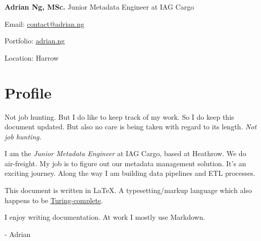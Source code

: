 \documentclass[letterpaper,11pt]{article}
\begin{document}
\noindent
\Large
\textbf{Adrian Ng, MSc.}
\newline
\small
Junior Metadata Engineer at IAG Cargo
\newline
\begin{description*}
	\item[Email:] \href{mailto:contact@adrian.ng}{contact@adrian.ng}
	\item[Portfolio:] \href{https://adrian.ng}{adrian.ng}
	\item[Location:] Harrow
\end{description*}
\hfill
\vspace{0.25cm}
\noindent
\begin{minipage}[t]{0.5\linewidth}
	\section{Profile}
	Not job hunting. But I do like to keep track of my work. So I do keep this document updated. But also no care is being taken with regard to its length. \textit{Not job hunting.}
	\par\quad

	I am the \textit{Junior Metadata Engineer} at IAG Cargo, based at Heathrow. We do air-freight. My job is to figure out our metadata management solution. It's an exciting journey. Along the way I am building data pipelines and ETL processes.
	\par\quad

	This document is written in \LaTeX. A typesetting/markup language which also happens to be \href{https://www.overleaf.com/learn/latex/Articles/LaTeX_is_More_Powerful_than_you_Think_-_Computing_the_Fibonacci_Numbers_and_Turing_Completeness}{Turing-complete}.

	I enjoy writing documentation. At work I mostly use Markdown.
	\par\quad

	- Adrian
\end{minipage}
\hspace{0.2cm}
\end{document}
